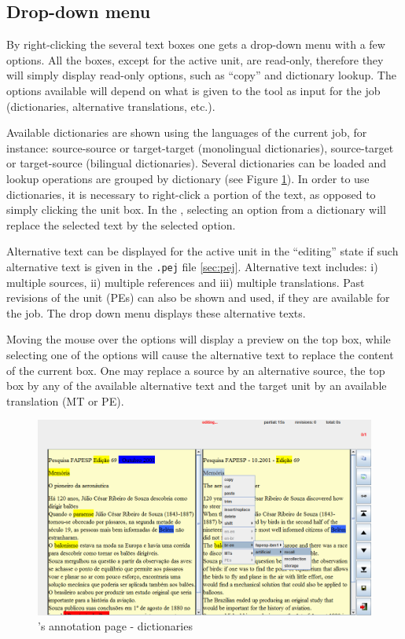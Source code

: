 
\subsection{Drop-down menu}\label{sec:menu}

By right-clicking the several text boxes one gets a drop-down menu with a few options.
All the boxes, except for the active unit, are read-only, therefore they will simply display read-only options, such as ``copy'' and dictionary lookup. The options available will depend on what is given to the tool as input for the job (dictionaries, alternative translations, etc.).

Available dictionaries are shown using the languages of the current job, for instance: source-source or target-target (monolingual dictionaries), source-target or target-source (bilingual dictionaries).
Several dictionaries can be loaded and lookup operations are grouped by dictionary (see Figure \ref{fig:dictionary}). In order to use dictionaries, it is necessary to right-click a portion of the text, as opposed to simply clicking the unit box. 
In the , selecting an option from a dictionary will replace the selected text by the selected option.

Alternative text can be displayed for the active unit in the ``editing'' state if such alternative text is given in the {\tt .pej} file \ref{sec:pej}.
Alternative text includes: i) multiple sources, ii) multiple references and iii) multiple translations. Past revisions of the unit (PEs) can also be shown and used, if they are available for the job.
The drop down menu displays these alternative texts.

Moving the mouse over the options will display a preview on the top box, while selecting one of the options will cause the alternative text to replace the content of the current box.
One may replace a source by an alternative source, the top box by any of the available alternative text and the target unit by an available translation (MT or PE).

\begin{figure}[h]\label{fig:dictionary}
\includegraphics[width=1\textwidth]{img/annotation-dictionary}
\caption{\PET's annotation page - dictionaries}
\end{figure}

